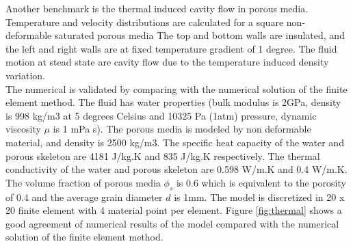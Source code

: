 \documentclass[preprint,12pt]{elsarticle}
\begin{document}
%
%
Another benchmark is the thermal induced cavity flow in porous media. Temperature and velocity distributions are calculated for a square non-deformable saturated porous media The top and bottom walls are insulated, and the left and right walls are at fixed temperature gradient of 1 degree. The fluid motion at stead state are cavity flow due to the temperature induced density variation. \\
The numerical is validated by comparing with the numerical solution of the finite element method. The fluid has water properties (bulk modulus is 2GPa, density is 998 kg/m3 at 5 degrees Celsius and 10325 Pa (1atm) pressure, dynamic viscosity $\mu$ is 1 mPa s). The porous media is modeled by non deformable material, and density is 2500 kg/m3. The specific heat capacity of the water and porous skeleton are 4181 J/kg.K and 835 J/kg.K respectively. The thermal conductivity of the water and porous skeleton are 0.598 W/m.K and 0.4 W/m.K. The volume fraction of porous media $\phi_s$ is 0.6 which is equivalent to the porosity of 0.4 and the average grain diameter $d$ is 1mm. The model is discretized in 20 x 20 finite element with 4 material point per element. Figure \ref{fig:thermal} shows a good agreement of numerical results of the model compared with the numerical solution of the finite element method. \\
\end{document}

